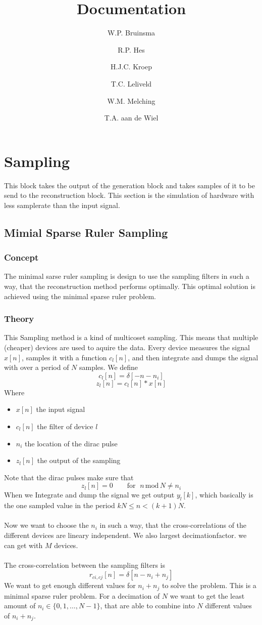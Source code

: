 \documentclass[report, oneside, a4paper, openany]{memoir}
\title{Documentation}
\author{W.P. Bruinsma \and R.P. Hes \and H.J.C. Kroep \and T.C. Leliveld \and W.M. Melching \and T.A. aan de Wiel}
\begin{document}
\chapter{Sampling}
This block takes the output of the generation block and takes samples of it to be send to the reconstruction block. 
This section is the simulation of hardware with less samplerate than the input signal.


\section{Mimial Sparse Ruler Sampling}
\subsection{Concept}
The minimal sarse ruler sampling is design to use the sampling filters in such a way, that the reconstruction method performs optimally. This optimal solution is achieved using the minimal sparse ruler problem.
\subsection{Theory}
This Sampling method is a kind of multicoset sampling. This means that multiple (cheaper) devices are used to aquire the data. Every device measures the signal $x[n]$, samples it with a function $c_l[n]$, and then integrate and dumps the signal with over a period of $N$ samples. We define 
$$
c_l[n] = \delta[-n -n_i]
$$
$$
z_l[n] = c_l[n]\ast x[n] 
$$
Where
\begin{itemize}
\item $x[n]$ the input signal
\item $c_l[n]$ the filter of device $l$
\item $n_i$ the location of the dirac pulse
\item $z_l[n]$ the output of the sampling
\end{itemize}
Note that the dirac pulses make sure that
$$z_l[n]=0 \quad \quad \text{for }\;n\,\text{mod}\,N\neq n_i$$
When we Integrate and dump the signal we get output $y_l[k]$, which basically is the one sampled value in the period $kN\leq n<(k+1)N$.\\
\\
Now we want to choose the $n_i$ in such a way, that the cross-correlations of the different devices are lineary independent. We also largest decimationfactor. we can get with $M$ devices.\\
\\
The cross-correlation between the sampling filters is 
$$
r_{ci,cj}[n] = \delta [n-n_i+n_j]
$$
We want to get enough different values for $n_i+n_j$ to solve the problem. This is a minimal sparse ruler problem. For a decimation of $N$ we want to get the least amount of $n_i \in \{0,1,\dots,N-1\}$, that are able to combine into $N$ different values of $n_i+n_j$. 
\end{document}
